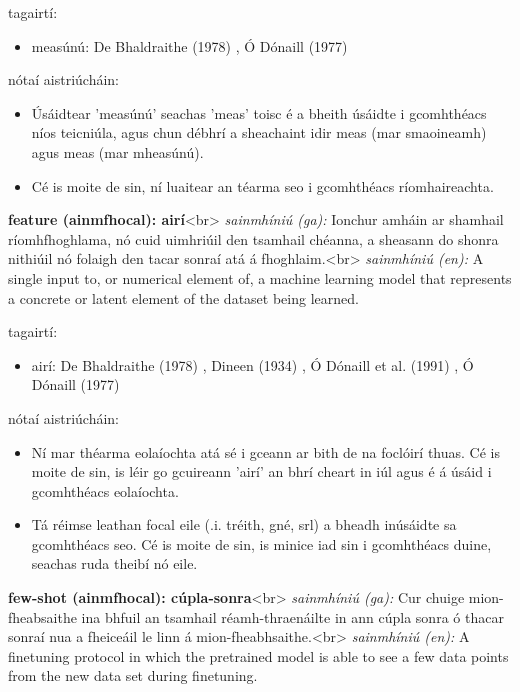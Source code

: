 \documentclass{article}
\begin{document}
tagairtí:
\begin{itemize}
	\item measúnú: De Bhaldraithe (1978) \cite{de-bhaldraithe}, Ó Dónaill (1977) \cite{odonaill}
\end{itemize}

nótaí aistriúcháin:
\begin{itemize}
	\item Úsáidtear 'measúnú' seachas 'meas' toisc é a bheith úsáidte i gcomhthéacs níos teicniúla, agus chun débhrí a sheachaint idir meas (mar smaoineamh) agus meas (mar mheasúnú).
	\item Cé is moite de sin, ní luaitear an téarma seo i gcomhthéacs ríomhaireachta.
\end{itemize}


\textbf{feature (ainmfhocal): airí}<br>
\textit{sainmhíniú (ga):} Ionchur amháin ar shamhail ríomhfhoghlama, nó cuid uimhriúil den tsamhail chéanna, a sheasann do shonra nithiúil nó folaigh den tacar sonraí atá á fhoghlaim.<br>
\textit{sainmhíniú (en):} A single input to, or numerical element of, a machine learning model that represents a concrete or latent element of the dataset being learned.

tagairtí:
\begin{itemize}
	\item airí: De Bhaldraithe (1978) \cite{de-bhaldraithe}, Dineen (1934) \cite{dineen}, Ó Dónaill et al. (1991) \cite{focloir-beag}, Ó Dónaill (1977) \cite{odonaill}
\end{itemize}

nótaí aistriúcháin:
\begin{itemize}
	\item Ní mar théarma eolaíochta atá sé i gceann ar bith de na foclóirí thuas. Cé is moite de sin, is léir go gcuireann 'airí' an bhrí cheart in iúl agus é á úsáid i gcomhthéacs eolaíochta.
	\item Tá réimse leathan focal eile (.i. tréith, gné, srl) a bheadh inúsáidte sa gcomhthéacs seo. Cé is moite de sin, is minice iad sin i gcomhthéacs duine, seachas ruda theibí nó eile.
\end{itemize}


\textbf{few-shot (ainmfhocal): cúpla-sonra}<br>
\textit{sainmhíniú (ga):} Cur chuige mion-fheabsaithe ina bhfuil an tsamhail réamh-thraenáilte in ann cúpla sonra ó thacar sonraí nua a fheiceáil le linn á mion-fheabhsaithe.<br>
\textit{sainmhíniú (en):} A finetuning protocol in which the pretrained model is able to see a few data points from the new data set during finetuning.
\end{document}
